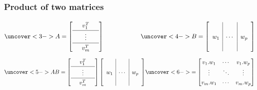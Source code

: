 \documentclass[9pt]{beamer}
\begin{document}
\begin{frame}[t]
 \frametitle{Product of two matrices}

 \[ \uc<3->{A = \renewcommand{\arraystretch}{1.3}
        \left[\begin{array}{ccc}
         & v_1^T & \\ \hline
         & \vdots & \\ \hline 
         & v_m^T & 
        \end{array}\right]}
    \hspace{6em}
    \uc<4->{B = \left[\begin{array}{c|c|c}
         && \\ w_1 & \dotsb & w_p \\ &&
        \end{array}\right]} 
 \]
 \[ \uc<5->{AB = \renewcommand{\arraystretch}{1.3}
        \left[\begin{array}{ccc}
         & v_1^T & \\ \hline
         & \vdots & \\ \hline 
         & v_m^T & 
        \end{array}\right]
        \left[\begin{array}{c|c|c}
         && \\ w_1 & \dotsb & w_p \\ &&
        \end{array}\right]} 
    \uc<6->{= \bbm
        v_1.w_1 & \cdots & v_1.w_p \\
        \vdots  & \ddots & \vdots \\
        v_m.w_1 & \cdots & v_m.w_p 
      \ebm}
 \]
\end{frame}
\end{document}
